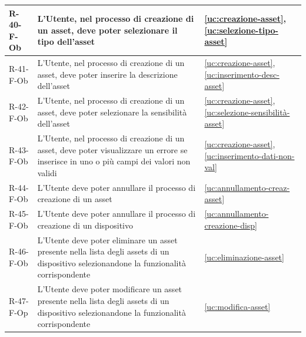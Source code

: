 ﻿\documentclass[a4paper,12pt]{article}
\begin{document}
{{\begin{longtable}{|l|p{}|p{}|}
            R-40-F-Ob       & L'Utente, nel processo di creazione di un asset, deve poter selezionare il tipo dell'asset                                                                                                  & \ref{uc:creazione-asset}, \ref{uc:selezione-tipo-asset}                 \\ \hline
            R-41-F-Ob       & L'Utente, nel processo di creazione di un asset, deve poter inserire la descrizione dell'asset                                                                                              & \ref{uc:creazione-asset}, \ref{uc:inserimento-desc-asset}                 \\ \hline
            R-42-F-Ob       & L'Utente, nel processo di creazione di un asset, deve poter selezionare la sensibilità dell'asset                                                                                           & \ref{uc:creazione-asset}, \ref{uc:selezione-sensibilità-asset}                 \\ \hline
            R-43-F-Ob       & L'Utente, nel processo di creazione di un asset, deve poter visualizzare un errore se inserisce in uno o più campi dei valori non validi                                                    & \ref{uc:creazione-asset}, \ref{uc:inserimento-dati-non-val}                     \\ \hline
            R-44-F-Ob       & L'Utente deve poter annullare il processo di creazione di un asset                                                                                                                          & \ref{uc:annullamento-creaz-asset}                                               \\ \hline
            R-45-F-Ob       & L'Utente deve poter annullare il processo di creazione di un dispositivo                                                                                                                    & \ref{uc:annullamento-creazione-disp}                                               \\ \hline
            R-46-F-Ob       & L'Utente deve poter eliminare un asset presente nella lista degli assets di un dispositivo selezionandone la funzionalità corrispondente                                                    & \ref{uc:eliminazione-asset}                                               \\ \hline
            R-47-F-Op       & L'Utente deve poter modificare un asset presente nella lista degli assets di un dispositivo selezionandone la funzionalità corrispondente                                                   & \ref{uc:modifica-asset}                                               \\ \hline

\end{longtable}}}
\end{document}
